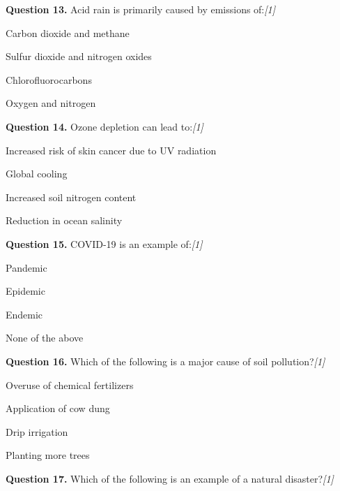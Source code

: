 \documentclass[11pt,a4paper]{article}
\newcommand{\pts}[1]{\hfill   \textit{[#1]}}
\begin{document}
\medskip


\noindent   \textbf{Question 13.} Acid rain is primarily caused by emissions of:\pts{1}

\begin{parts}
  \item Carbon dioxide and methane
  \item Sulfur dioxide and nitrogen oxides
  \item Chlorofluorocarbons
  \item Oxygen and nitrogen
\end{parts}

\medskip


\noindent   \textbf{Question 14.} Ozone depletion can lead to:\pts{1}

\begin{parts}
  \item Increased risk of skin cancer due to UV radiation
  \item Global cooling
  \item Increased soil nitrogen content
  \item Reduction in ocean salinity
\end{parts}

\medskip


\noindent   \textbf{Question 15.} COVID-19 is an example of:\pts{1}

\begin{parts}
  \item Pandemic
  \item Epidemic
  \item Endemic
  \item None of the above
\end{parts}

\medskip


\noindent   \textbf{Question 16.} Which of the following is a major cause of soil pollution?\pts{1}

\begin{parts}
  \item Overuse of chemical fertilizers
  \item Application of cow dung
  \item Drip irrigation
  \item Planting more trees
\end{parts}

\medskip


\noindent   \textbf{Question 17.} Which of the following is an example of a natural disaster?\pts{1}
\end{document}
